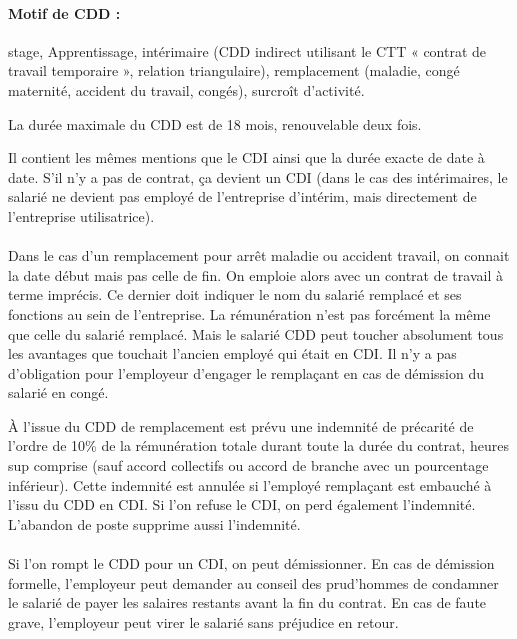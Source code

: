 \paragraph{Motif de CDD :} stage, Apprentissage, intérimaire (CDD indirect utilisant le CTT « contrat de travail temporaire », relation triangulaire), remplacement (maladie, congé maternité, accident du travail, congés), surcroît d’activité.

La durée maximale du CDD est de 18 mois, renouvelable deux fois.

Il contient les mêmes mentions que le CDI ainsi que la durée exacte de date à date.
S’il n’y a pas de contrat, ça devient un CDI (dans le cas des intérimaires, le salarié ne devient pas employé de l'entreprise d’intérim, mais directement de l'entreprise utilisatrice).

\paragraph{}
Dans le cas d’un remplacement pour arrêt maladie ou accident travail, on connait la date début mais pas celle de fin.
On emploie alors avec un contrat de travail à terme imprécis.
Ce dernier doit indiquer le nom du salarié remplacé et ses fonctions au sein de l’entreprise.
La rémunération n’est pas forcément la même que celle du salarié remplacé.
Mais le salarié CDD peut toucher absolument tous les avantages que touchait l’ancien employé qui était en CDI.
Il n'y a pas d’obligation pour l’employeur d’engager le remplaçant en cas de démission du salarié en congé.

À l’issue du CDD de remplacement est prévu une indemnité de précarité de l’ordre de 10\% de la rémunération totale durant toute la durée du contrat, heures sup comprise (sauf accord collectifs ou accord de branche avec un pourcentage inférieur).
Cette indemnité est annulée si l’employé remplaçant est embauché à l’issu du CDD en CDI.
Si l’on refuse le CDI, on perd également l’indemnité.
L’abandon de poste supprime aussi l’indemnité.

\paragraph{}
Si l’on rompt le CDD pour un CDI, on peut démissionner.
En cas de démission formelle, l’employeur peut demander au conseil des prud’hommes de condamner le salarié de payer les salaires restants avant la fin du contrat.
En cas de faute grave, l’employeur peut virer le salarié sans préjudice en retour.


